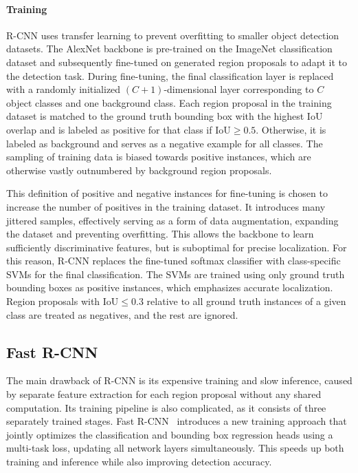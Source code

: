 \paragraph{Training} R-CNN uses transfer learning to prevent overfitting to smaller object detection datasets. The AlexNet backbone is pre-trained on the ImageNet classification dataset and subsequently fine-tuned on generated region proposals to adapt it to the detection task. During fine-tuning, the final classification layer is replaced with a randomly initialized $(C + 1)$-dimensional layer corresponding to $C$ object classes and one background class. Each region proposal in the training dataset is matched to the ground truth bounding box with the highest IoU overlap and is labeled as positive for that class if $\text{IoU} \ge 0.5$. Otherwise, it is labeled as background and serves as a negative example for all classes. The sampling of training data is biased towards positive instances, which are otherwise vastly outnumbered by background region proposals.

This definition of positive and negative instances for fine-tuning is chosen to increase the number of positives in the training dataset. It introduces many jittered samples, effectively serving as a form of data augmentation, expanding the dataset and preventing overfitting. This allows the backbone to learn sufficiently discriminative features, but is suboptimal for precise localization. For this reason, R-CNN replaces the fine-tuned softmax classifier with class-specific SVMs for the final classification. The SVMs are trained using only ground truth bounding boxes as positive instances, which emphasizes accurate localization. Region proposals with $\text{IoU} \le 0.3$ relative to all ground truth instances of a given class are treated as negatives, and the rest are ignored.~\cite{Girshick2014}

\subsection{Fast R-CNN}
The main drawback of R-CNN is its expensive training and slow inference, caused by separate feature extraction for each region proposal without any shared computation. Its training pipeline is also complicated, as it consists of three separately trained stages. Fast R-CNN~\cite{Girshick2015} introduces a new training approach that jointly optimizes the classification and bounding box regression heads using a multi-task loss, updating all network layers simultaneously. This speeds up both training and inference while also improving detection accuracy.

